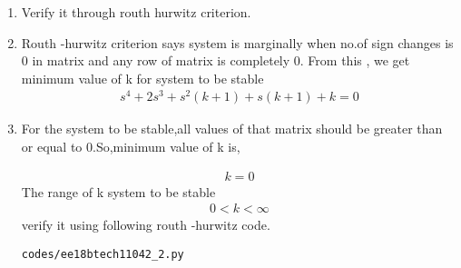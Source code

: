 \begin{enumerate}[label=\thesection.\arabic*.,ref=\thesection.\theenumi]
\item Verify it through routh hurwitz criterion.  
\item  Routh -hurwitz criterion says system is marginally  when no.of sign changes is 0 in matrix and any row of matrix is completely 0. From this , we get minimum value of k for system to be stable
\begin{align}
s^4+2s^3+s^2(k+1)+s(k+1)+k = 0
\label{eq:ee18btech11042_6}
\end{align}
\item For the system to be stable,all values of that matrix should be greater than or equal to 0.So,minimum value of k is,


\begin{align}
k = 0
\label{eq:ee18btech11042_7}
\end{align}
The range of k system to be stable
\begin{align}
0<k<\infty
\label{eq:ee18btech11042_8}
\end{align}
verify it using following routh -hurwitz code.

\begin{lstlisting}
codes/ee18btech11042_2.py
\end{lstlisting}
\end{enumerate}